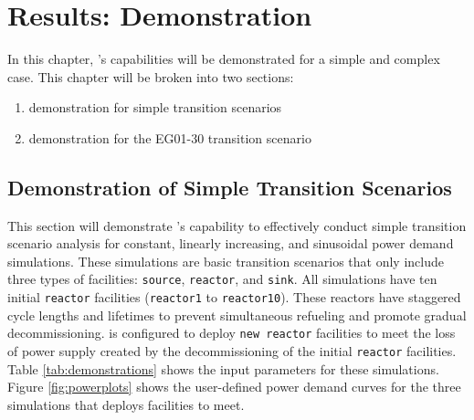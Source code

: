 \chapter{Results: \deploy Demonstration}
In this chapter, \deploy's capabilities will be demonstrated 
for a simple and complex case.  
This chapter will be broken into two sections: 
\begin{enumerate}
    \item \deploy demonstration for simple transition scenarios
    \item \deploy demonstration for the EG01-30 transition scenario
\end{enumerate}

\section{\deploy Demonstration of Simple Transition Scenarios}
\label{sec:demo}

This section will demonstrate \deploy's capability 
to effectively conduct simple transition scenario analysis
for constant, linearly increasing, and 
sinusoidal power demand simulations.
These simulations are basic transition scenarios that only include 
three types of facilities: \texttt{source}, \texttt{reactor}, and 
\texttt{sink}. 
All simulations have ten initial \texttt{reactor} facilities 
(\texttt{reactor1} to \texttt{reactor10}). 
These reactors have staggered cycle lengths and lifetimes to prevent 
simultaneous refueling and promote gradual decommissioning. 
\deploy is configured to deploy \texttt{new reactor} facilities
to meet the loss of power supply created by the decommissioning 
of the initial \texttt{reactor} facilities. 
Table \ref{tab:demonstrations} shows the 
\deploy input parameters for these simulations.
Figure \ref{fig:powerplots} shows the user-defined power demand curves 
for the three simulations that \deploy deploys facilities to meet.

